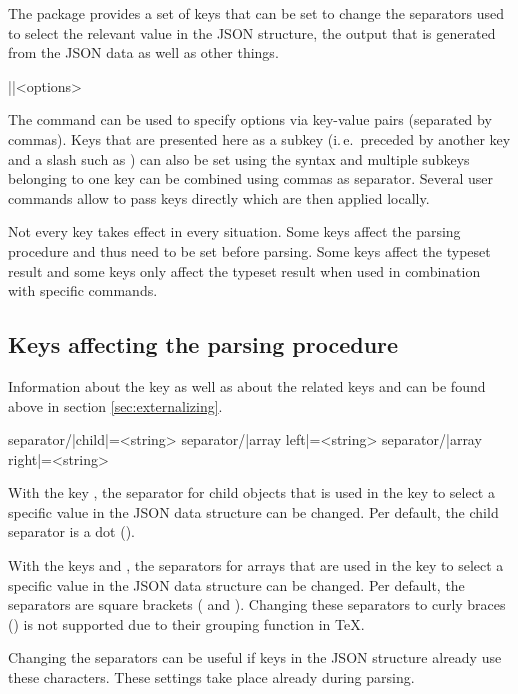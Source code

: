 \documentclass[a4paper]{article}
\begin{document}
{{The package provides a set of keys that can be set to change the separators used to select the relevant value in the JSON structure, the output that is generated from the JSON data as well as other things.

\begin{macrodef}
|\JSONParseSet|{<options>}
\end{macrodef}
The command \macro{\JSONParseSet} can be used to specify options via key-value pairs (separated by commas). Keys that are presented here as a subkey (i.\,e.\ preceded by another key and a slash such as ) can also be set using the syntax  and multiple subkeys belonging to one key can be combined using commas as separator. Several user commands allow to pass keys directly which are then applied locally.

Not every key takes effect in every situation. Some keys affect the parsing procedure and thus need to be set before parsing. Some keys affect the typeset result and some keys only affect the typeset result when used in combination with specific commands.

\subsection{Keys affecting the parsing procedure}

Information about the key  as well as about the related keys  and  can be found above in section \ref{sec:externalizing}.

\begin{macrodef}
separator/|child|={<string>}
separator/|array left|={<string>}
separator/|array right|={<string>}
\end{macrodef}
With the key , the separator for child objects that is used in the key to select a specific value in the JSON data structure can be changed. Per default, the child separator is a dot ().

With the keys  and , the separators for arrays that are used in the key to select a specific value in the JSON data structure can be changed. Per default, the separators are square brackets (\macro{[} and \macro{]}). Changing these separators to curly braces (\macro{{}}) is not supported due to their grouping function in TeX.

Changing the separators can be useful if keys in the JSON structure already use these characters. These settings take place already during parsing.

}}
\end{document}
